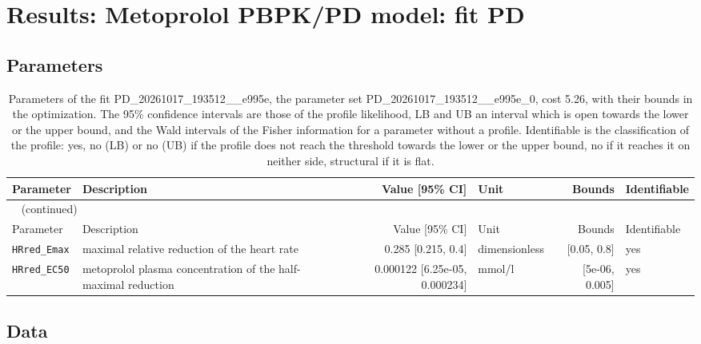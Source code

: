 \documentclass{article}
\begin{document}
\section{Results: Metoprolol PBPK/PD model: fit PD}

\subsection{Parameters}

\begin{longtable}{llrlrl}
\caption{Parameters of the fit PD\_20261017\_193512\_\_e995e, the parameter set PD\_20261017\_193512\_\_e995e\_0, cost 5.26, with their bounds in the optimization. The 95\% confidence intervals are those of the profile likelihood, LB and UB an interval which is open towards the lower or the upper bound, and the Wald intervals of the Fisher information for a parameter without a profile. Identifiable is the classification of the profile: yes, no (LB) or no (UB) if the profile does not reach the threshold towards the lower or the upper bound, no if it reaches it on neither side, structural if it is flat.}\label{tab:parameters:PD_20261017_193512__e995e} \\
\toprule
Parameter & Description & Value [95\% CI] & Unit & Bounds & Identifiable \\
\midrule
\endfirsthead
\multicolumn{6}{l}{\small\tablename~\thetable{} (continued)} \\
\toprule
Parameter & Description & Value [95\% CI] & Unit & Bounds & Identifiable \\
\midrule
\endhead
\bottomrule
\endlastfoot
\texttt{HRred\_Emax} & maximal relative reduction of the heart rate & 0.285 [0.215, 0.4] & dimensionless & [0.05, 0.8] & yes \\
\texttt{HRred\_EC50} & metoprolol plasma concentration of the half-maximal reduction & 0.000122 [6.25e-05, 0.000234] & mmol/l & [5e-06, 0.005] & yes \\
\end{longtable}

\subsection{Data}
\end{document}
